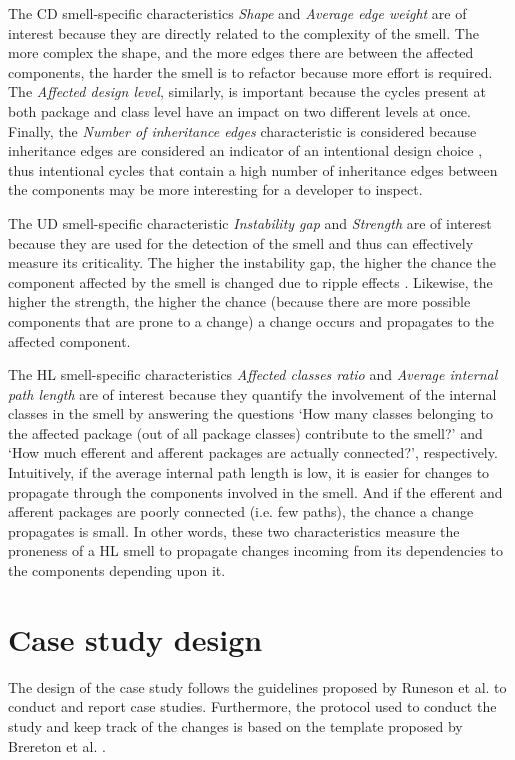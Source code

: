 The CD smell-specific characteristics \emph{Shape} and \emph{Average edge weight} are of interest because they are directly related to the complexity of the smell.
The more complex the shape, and the more edges there are between the affected components, the harder the smell is to refactor because more effort is required.
The \emph{Affected design level}, similarly, is important because the cycles present at both package and class level have an impact on two different levels at once.
Finally, the \emph{Number of inheritance edges} characteristic is considered because inheritance edges are considered an indicator of an intentional design choice \cite{Laval2012}, thus intentional cycles that contain a high number of inheritance edges between the components may be more interesting for a developer to inspect.

The UD smell-specific characteristic \emph{Instability gap} and \emph{Strength} are of interest because they are used for the detection of the smell and thus can effectively measure its criticality. The higher the instability gap, the higher the chance the component affected by the smell is changed due to ripple effects \cite{Martin2018}. Likewise, the higher the strength, the higher the chance (because there are more possible components that are prone to a change) a change occurs and propagates to the affected component.

The HL smell-specific characteristics \emph{Affected classes ratio} and \emph{Average internal path length} are of interest because they quantify the involvement of the internal classes in the smell by answering the questions `How many classes belonging to the affected package (out of all package classes) contribute to the smell?' and `How much efferent and afferent packages are actually connected?', respectively.
Intuitively, if the average internal path length is low, it is easier for changes to propagate through the components involved in the smell. And if the efferent and afferent packages are poorly connected (i.e. few paths), the chance a change propagates is small.
In other words, these two characteristics measure the proneness of a HL smell to propagate changes incoming from its dependencies to the components depending upon it.

\section{Case study design}\label{c3:sec:case-study}
The design of the case study follows the guidelines proposed by Runeson et al. \cite{Runeson2012} to conduct and report case studies.
Furthermore, the protocol used to conduct the study and keep track of the changes is based on the template proposed by Brereton et al. \cite{Brereton2008}.


